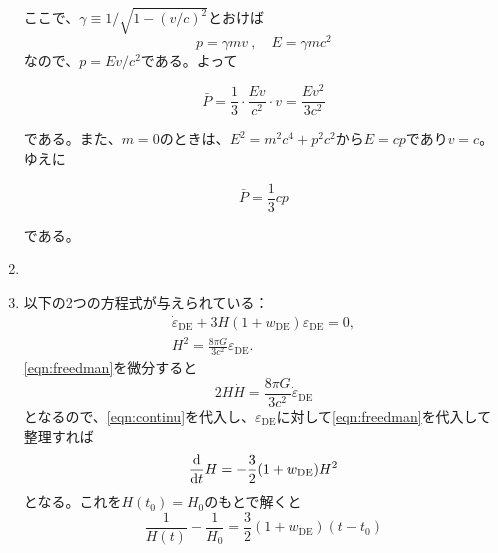 \documentclass[unicode,a4paper,10pt]{ltjsarticle}
\begin{document}
\begin{enumerate}
  ここで、$\gamma\equiv1/\sqrt{1-(v/c)^2}$とおけば
  \begin{equation}
    p
    =
    \gamma mv
    \ ,\quad
    E
    =
    \gamma mc^2
  \end{equation}
  なので、$p=Ev/c^2$である。よって
  \begin{graybox}
    \begin{equation}
      \bar{P}
      =
      \frac{1}{3}\cdot\frac{Ev}{c^2}\cdot v
      =
      \frac{Ev^2}{3c^2}
    \end{equation}
  \end{graybox}
  である。また、$m=0$のときは、$E^2=m^2c^4+p^2c^2$から$E=cp$であり$v=c$。ゆえに
  \begin{graybox}
    \begin{equation}
      \bar{P}
      =
      \frac{1}{3}cp
    \end{equation}
  \end{graybox}
  である。


  \item 
  
  \item 
  以下の2つの方程式が与えられている：
  \begin{gather}
    \dot{\varepsilon}_{\textrm{DE}}
    +
    3H(1+w_{\textrm{DE}})\varepsilon_{\textrm{DE}}
    =
    0
    ,
    \label{eqn:continu}
    \\
    H^2
    =
    \frac{8\pi G}{3c^2}\varepsilon_{\textrm{DE}}
    .
    \label{eqn:freedman}
  \end{gather}
  \eqref{eqn:freedman}を微分すると
  \begin{equation}
    2H\dot{H}
    =
    \frac{8\pi G}{3c^2}\dot{\varepsilon}_{\textrm{DE}}
  \end{equation}
  となるので、\eqref{eqn:continu}を代入し、$\varepsilon_{\textrm{DE}}$に対して\eqref{eqn:freedman}を代入して整理すれば
  \begin{equation}
    \dv{}{t}H
    =
    -\frac{3}{2}(1+w_{\textrm{DE}})H^2
  \end{equation}
  となる。これを$H(t_{0})=H_{0}$のもとで解くと
  \begin{equation}
    \frac{1}{H(t)}
    -
    \frac{1}{H_{0}}
    =
    \frac{3}{2}(1+w_{\textrm{DE}})(t-t_{0})
  \end{equation}












\end{enumerate}
\end{document}

